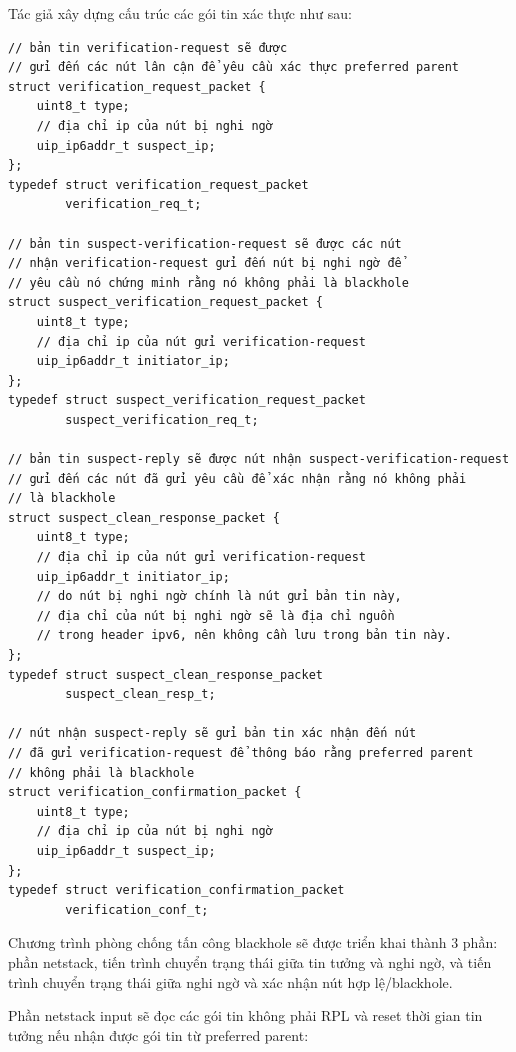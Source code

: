 Tác giả xây dựng cấu trúc các gói tin xác thực như sau:

\begin{verbatim}
// bản tin verification-request sẽ được 
// gửi đến các nút lân cận để yêu cầu xác thực preferred parent
struct verification_request_packet {
    uint8_t type;
    // địa chỉ ip của nút bị nghi ngờ
    uip_ip6addr_t suspect_ip;
};
typedef struct verification_request_packet
        verification_req_t;

// bản tin suspect-verification-request sẽ được các nút
// nhận verification-request gửi đến nút bị nghi ngờ để 
// yêu cầu nó chứng minh rằng nó không phải là blackhole
struct suspect_verification_request_packet {
    uint8_t type;
    // địa chỉ ip của nút gửi verification-request
    uip_ip6addr_t initiator_ip;
};
typedef struct suspect_verification_request_packet
        suspect_verification_req_t;

// bản tin suspect-reply sẽ được nút nhận suspect-verification-request
// gửi đến các nút đã gửi yêu cầu để xác nhận rằng nó không phải
// là blackhole
struct suspect_clean_response_packet {
    uint8_t type;
    // địa chỉ ip của nút gửi verification-request
    uip_ip6addr_t initiator_ip;
    // do nút bị nghi ngờ chính là nút gửi bản tin này,
    // địa chỉ của nút bị nghi ngờ sẽ là địa chỉ nguồn
    // trong header ipv6, nên không cần lưu trong bản tin này.
};
typedef struct suspect_clean_response_packet
        suspect_clean_resp_t;

// nút nhận suspect-reply sẽ gửi bản tin xác nhận đến nút
// đã gửi verification-request để thông báo rằng preferred parent
// không phải là blackhole
struct verification_confirmation_packet {
    uint8_t type;
    // địa chỉ ip của nút bị nghi ngờ
    uip_ip6addr_t suspect_ip;
};
typedef struct verification_confirmation_packet
        verification_conf_t;
\end{verbatim}

Chương trình phòng chống tấn công blackhole sẽ được triển khai thành 3 phần: phần netstack, tiến trình chuyển trạng thái giữa tin tưởng và nghi ngờ, và tiến trình chuyển trạng thái giữa nghi ngờ và xác nhận nút hợp lệ/blackhole.

Phần netstack input sẽ đọc các gói tin không phải RPL và reset thời gian tin tưởng nếu nhận được gói tin từ preferred parent:

